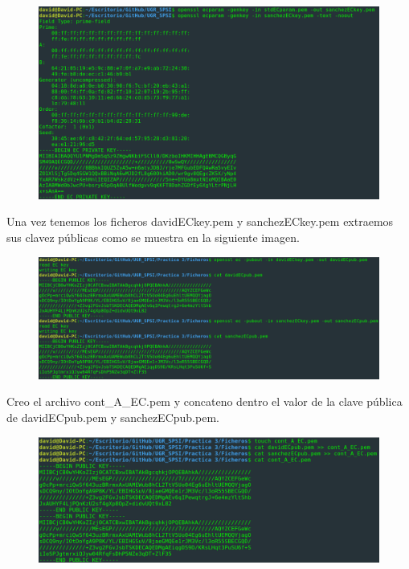 \documentclass[10pt,a4paper,spanish]{report}
\begin{document}
\begin{figure}[!hbp]
 \centering  \includegraphics[width=1\textwidth]{./Imagenes/8_3.png}
\end{figure}

\newpage
\noindent
Una vez tenemos los ficheros davidECkey.pem y sanchezECkey.pem extraemos sus clavez públicas como se muestra en la siguiente imagen.

\begin{figure}[!hbp]
 \centering  \includegraphics[width=1\textwidth]{./Imagenes/8_4.png}
\end{figure}

\noindent
Creo el archivo cont\_A\_EC.pem y concateno dentro el valor de la clave pública de davidECpub.pem y sanchezECpub.pem.

\begin{figure}[!hbp]
 \centering  \includegraphics[width=1\textwidth]{./Imagenes/8_6.png}
\end{figure}
\end{document}
